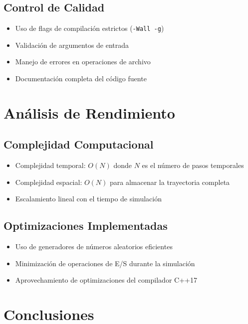 \documentclass[11pt,a4paper]{article}
\begin{document}
\subsection{Control de Calidad}
\begin{itemize}
    \item Uso de flags de compilación estrictos (\texttt{-Wall -g})
    \item Validación de argumentos de entrada
    \item Manejo de errores en operaciones de archivo
    \item Documentación completa del código fuente
\end{itemize}

\section{Análisis de Rendimiento}

\subsection{Complejidad Computacional}
\begin{itemize}
    \item Complejidad temporal: $O(N)$ donde $N$ es el número de pasos temporales
    \item Complejidad espacial: $O(N)$ para almacenar la trayectoria completa
    \item Escalamiento lineal con el tiempo de simulación
\end{itemize}

\subsection{Optimizaciones Implementadas}
\begin{itemize}
    \item Uso de generadores de números aleatorios eficientes
    \item Minimización de operaciones de E/S durante la simulación
    \item Aprovechamiento de optimizaciones del compilador C++17
\end{itemize}

\section{Conclusiones}
\end{document}
